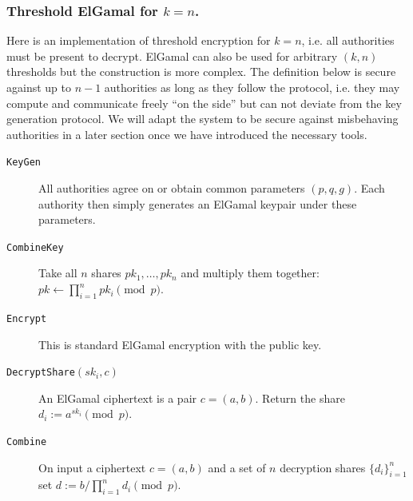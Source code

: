 \documentclass[envcountsame]{llncs}
\newcommand{\alg}[1]{\textup{\texttt{#1}}}
\begin{document}
\subsubsection{Threshold ElGamal for $k = n$.}
Here is an implementation of threshold encryption for $k = n$, i.e. all
authorities must be present to decrypt. ElGamal can also be used for arbitrary
$(k, n)$ thresholds but the construction is more complex.
The definition below is secure against up to $n - 1$ authorities as long as they
follow the protocol, i.e. they may compute and communicate freely ``on the
side'' but can not deviate from the key generation protocol. We will adapt the
system to be secure against misbehaving authorities in a later section once we
have introduced the necessary tools.

\begin{description}
\item[\alg{KeyGen}]
All authorities agree on or obtain common parameters $(p, q, g)$. Each authority
then simply generates an ElGamal keypair under these parameters.

\item[\alg{CombineKey}]
Take all $n$ shares $pk_1, \ldots, pk_n$
and multiply them together:
$pk \gets \prod_{i=1}^n pk_i \pmod{p}$.

\item[\alg{Encrypt}] This is standard ElGamal encryption with the public key.

\item[\alg{DecryptShare}$(sk_i, c)$] An ElGamal ciphertext is a pair $c = (a, b)$. Return the share $d_i := a^{sk_i} \pmod{p}$.

\item[\alg{Combine}]
On input a ciphertext $c = (a, b)$ and a set of $n$ decryption shares
$\{d_i\}_{i=1}^n$
set $d := b / \prod_{i=1}^n d_i
\pmod{p}$.
\end{description}
\end{document}
